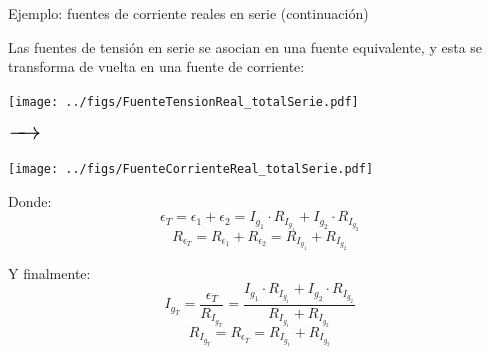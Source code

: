 \documentclass[aspectratio=169, xcolor={usenames,svgnames,dvipsnames}]{beamer}
\begin{document}

\begin{frame}{Ejemplo: \hspace{3mm}fuentes de corriente reales en serie \hspace{3mm}(continuación)}

    \vspace{1mm}
    Las fuentes de tensión en serie se asocian en una fuente equivalente, y esta se transforma de vuelta en una fuente de corriente:

    \begin{minipage}[c]{0.15\linewidth}
        \begin{center}
        \texttt{[image: ../figs/FuenteTensionReal\_totalSerie.pdf]}
        \end{center}
    \end{minipage}
    \begin{minipage}[c]{0.08\linewidth}
        $\LARGE \xrightarrow{\hspace*{0.5cm}}$ %
    \end{minipage}
    \begin{minipage}[c]{0.15\linewidth}
        \begin{center}
        \texttt{[image: ../figs/FuenteCorrienteReal\_totalSerie.pdf]}
        \end{center}
    \end{minipage}
    \begin{minipage}[c]{0.08\linewidth}
        \hfill
    \end{minipage}
    \begin{minipage}[c]{0.47\linewidth}
        \vspace{4mm}
        Donde:
        \[
          \epsilon_T = \epsilon_1 + \epsilon_2 = I_{g_1} \cdot R_{I_{g_1}} + I_{g_2} \cdot R_{I_{g_2}}
        \]  
        \[
          R_{\epsilon_T} = R_{\epsilon_1} + R_{\epsilon_2} = R_{I_{g_1}} + R_{I_{g_2}}
        \] 

        \vspace{2mm}
        Y finalmente:
        \[
          \boxed{
          I_{g_T} = \frac{\epsilon_T}{R_{I_{g_T}}} = \frac{I_{g_1} \cdot R_{I_{g_1}} + I_{g_2} \cdot R_{I_{g_2}}}{R_{I_{g_1}} + R_{I_{g_2}}}
          }
        \]
        \[
          \boxed{
          R_{I_{g_T}} = R_{\epsilon_T} = R_{I_{g_1}} + R_{I_{g_2}}
          }
        \]
    \end{minipage}
\end{frame}
\end{document}
